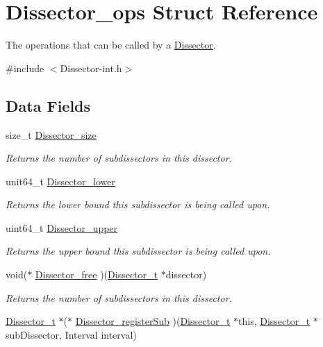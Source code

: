 \hypertarget{struct_dissector__ops}{\section{Dissector\-\_\-ops Struct Reference}
\label{struct_dissector__ops}
}


The operations that can be called by a \hyperlink{struct_dissector}{Dissector}.  




{\ttfamily \#include $<$Dissector-\/int.\-h$>$}

\subsection*{Data Fields}
\begin{DoxyCompactItemize}
\item 
size\-\_\-t \hyperlink{struct_dissector__ops_a8982a0368e988bc9cb93ee83d5411b99}{Dissector\-\_\-size}
\begin{DoxyCompactList}\small\item\em Returns the number of subdissectors in this dissector. \end{DoxyCompactList}\item 
unit64\-\_\-t \hyperlink{struct_dissector__ops_a12f42148d4173471c21f3b33296d9256}{Dissector\-\_\-lower}
\begin{DoxyCompactList}\small\item\em Returns the lower bound this subdissector is being called upon. \end{DoxyCompactList}\item 
uint64\-\_\-t \hyperlink{struct_dissector__ops_a3d9e177f508734b6136538e051b64699}{Dissector\-\_\-upper}
\begin{DoxyCompactList}\small\item\em Returns the upper bound this subdissector is being called upon. \end{DoxyCompactList}\item 
void($\ast$ \hyperlink{struct_dissector__ops_ad864a69acd7f1c8a503d1d2cb1ef8d90}{Dissector\-\_\-free} )(\hyperlink{struct_dissector}{Dissector\-\_\-t} $\ast$dissector)
\begin{DoxyCompactList}\small\item\em Returns the number of subdissectors in this dissector. \end{DoxyCompactList}\item 
\hyperlink{struct_dissector}{Dissector\-\_\-t} $\ast$($\ast$ \hyperlink{struct_dissector__ops_ac7b5b8ae6f666ad291eede1507effc20}{Dissector\-\_\-register\-Sub} )(\hyperlink{struct_dissector}{Dissector\-\_\-t} $\ast$this, \hyperlink{struct_dissector}{Dissector\-\_\-t} $\ast$sub\-Dissector, Interval interval)

\end{DoxyCompactItemize}
